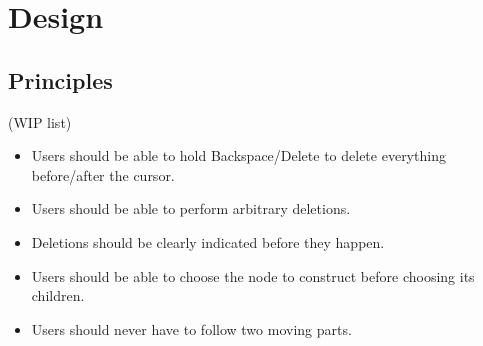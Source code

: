 \documentclass[runningheads]{llncs}
\begin{document}


\section{Design} \label{sec:design}

\subsection{Principles}

(WIP list)
\begin{itemize}
\item Users should be able to hold Backspace/Delete to delete everything before/after the cursor.
\item Users should be able to perform arbitrary deletions.
\item Deletions should be clearly indicated before they happen.
\item Users should be able to choose the node to construct before choosing its children.
\item Users should never have to follow two moving parts.
\end{itemize}
\end{document}
